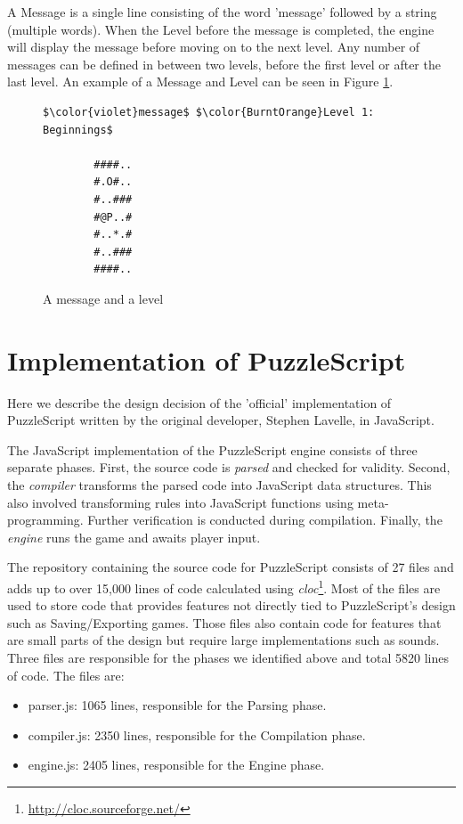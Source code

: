 A Message is a single line consisting of the word 'message' followed by a string (multiple words). When the Level before the message is completed, the engine will display the message before moving on to the next level. Any number of messages can be defined in between two levels, before the first level or after the last level. An example of a Message and Level can be seen in Figure \ref{fig:level_code}.

\begin{figure}
    \centering
    \begin{lstlisting}[language=PuzzleScript]
        $\color{violet}message$ $\color{BurntOrange}Level 1: Beginnings$
    
        ####..
        #.O#..
        #..###
        #@P..#
        #..*.#
        #..###
        ####..
    \end{lstlisting}
    \caption{A message and a level}
    \label{fig:level_code}
\end{figure}

\section{Implementation of PuzzleScript}
Here we describe the design decision of the 'official' implementation of PuzzleScript written by the original developer, Stephen Lavelle, in JavaScript.

The JavaScript implementation of the PuzzleScript engine consists of three separate phases. First, the source code is \emph{parsed} and checked for validity. Second, the \emph{compiler} transforms the parsed code into JavaScript data structures. This also involved transforming rules into JavaScript functions using meta-programming. Further verification is conducted during compilation. Finally, the \emph{engine} runs the game and awaits player input.

The repository containing the source code for PuzzleScript consists of 27 files and adds up to over 15,000 lines of code calculated using \emph{cloc}\footnote{\url{http://cloc.sourceforge.net/}}. Most of the files are used to store code that provides features not directly tied to PuzzleScript's design such as Saving/Exporting games. Those files also contain code for features that are small parts of the design but require large implementations such as sounds. Three files are responsible for the phases we identified above and total 5820 lines of code. The files are: \begin{itemize}
    \item parser.js: 1065 lines, responsible for the Parsing phase.
    \item compiler.js: 2350 lines, responsible for the Compilation phase.
    \item engine.js: 2405 lines, responsible for the Engine phase.
\end{itemize}

